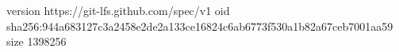 version https://git-lfs.github.com/spec/v1
oid sha256:944a683127c3a2458e2de2a133ce16824c6ab6773f530a1b82a67ceb7001aa59
size 1398256
